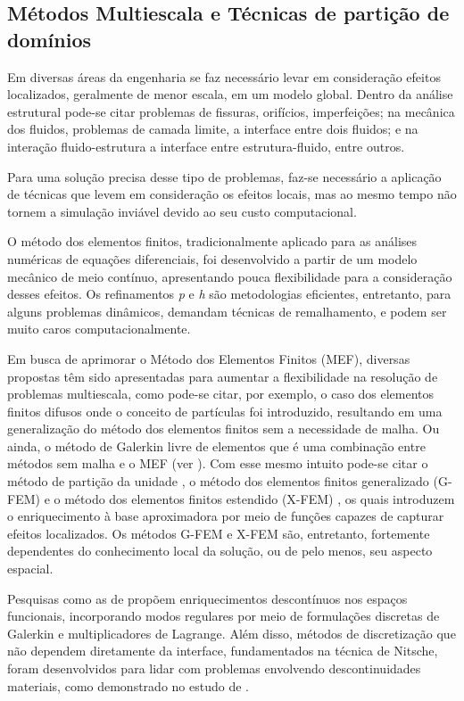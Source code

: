 \documentclass[tese_patricia.tex]{subfiles}
\begin{document}
 
\subsection{Métodos Multiescala e Técnicas de partição de domínios}
\label{arlequinsection}

Em diversas áreas da engenharia se faz necessário levar em consideração efeitos localizados, geralmente de menor escala, em um modelo global. Dentro da análise estrutural pode-se citar problemas de fissuras, orifícios, imperfeições; na mecânica dos fluidos, problemas de camada limite, a interface entre dois fluidos; e na interação fluido-estrutura a interface entre estrutura-fluido, entre outros.

Para uma solução precisa desse tipo de problemas, faz-se necessário a aplicação de técnicas que levem em consideração os efeitos locais, mas ao mesmo tempo não tornem a simulação inviável devido ao seu custo computacional.

O método dos elementos finitos, tradicionalmente aplicado para as análises numéricas de equações diferenciais, foi desenvolvido a partir de um modelo mecânico de meio contínuo, apresentando pouca flexibilidade para a consideração desses efeitos. Os refinamentos \textit{p} e \textit{h} são metodologias eficientes, entretanto, para alguns problemas dinâmicos, demandam técnicas de remalhamento, e podem ser muito caros computacionalmente.

Em busca de aprimorar o Método dos Elementos Finitos (MEF), diversas propostas têm sido apresentadas para aumentar a flexibilidade na resolução de problemas multiescala, como pode-se citar, por exemplo, o caso dos elementos finitos difusos \cite{NayrolesTV:1992} onde o conceito de partículas foi introduzido, resultando em uma generalização do método dos elementos finitos sem a necessidade de malha. Ou ainda,  o método de Galerkin livre de elementos que é uma combinação entre métodos sem malha e o MEF (ver ). Com esse mesmo intuito pode-se citar o método de partição da unidade \cite{MelenkB:1996}, o método dos elementos finitos generalizado (G-FEM) \cite{StrouboulisCB:2001} e o método dos elementos finitos estendido (X-FEM) \cite{Moes:2003}, os quais introduzem o enriquecimento à base aproximadora por meio de funções capazes de capturar efeitos localizados. Os métodos G-FEM e X-FEM são, entretanto, fortemente dependentes do conhecimento local da solução, ou de pelo menos, seu aspecto espacial.

Pesquisas como as de  propõem enriquecimentos descontínuos nos espaços funcionais, incorporando modos regulares por meio de formulações discretas de Galerkin e multiplicadores de Lagrange. Além disso, métodos de discretização que não dependem diretamente da interface, fundamentados na técnica de Nitsche, foram desenvolvidos para lidar com problemas envolvendo descontinuidades materiais, como demonstrado no estudo de .
\end{document}
